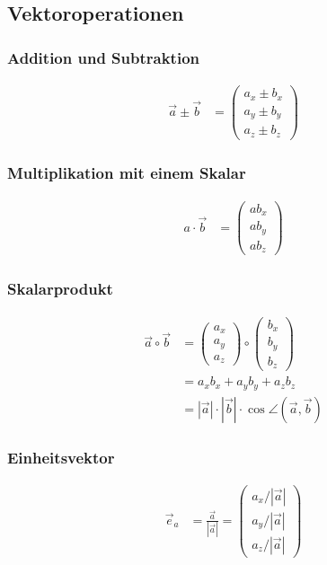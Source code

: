 \newpage
\subsection{Vektoroperationen}
\begin{multicols}{2}
\subsubsection*{Addition und Subtraktion}
\begin{align*} 
\vec{a}\pm\vec{b}&= \begin{pmatrix}a_x\pm b_x\\a_y\pm b_y\\a_z\pm b_z\end{pmatrix}
\end{align*}
\vfill
\subsubsection*{Multiplikation mit einem Skalar}
\begin{align*} 
a\cdot\vec{b}&= \begin{pmatrix}ab_x\\ ab_y\\ab_z\end{pmatrix}
\end{align*}
\vspace{5mm}
\vfill
\end{multicols}

\begin{multicols}{2}
\subsubsection*{Skalarprodukt}
\begin{align*} 
\vec{a}\circ\vec{b} &= \begin{pmatrix}a_x\\ a_y\\a_z\end{pmatrix}\circ\begin{pmatrix}b_x\\ b_y\\b_z\end{pmatrix}\\
&=a_xb_x+a_yb_y+a_zb_z\\
&=|\vec{a}|\cdot|\vec{b}|\cdot \cos\angle(\vec{a},\vec{b})
\end{align*}
\vfill
\subsubsection*{Einheitsvektor}
\begin{align*} 
\vec{e}_a&=\frac{\vec{a}}{|\vec{a}|}= \begin{pmatrix}a_x/|\vec{a}|\\ a_y/|\vec{a}|\\a_z/|\vec{a}|\end{pmatrix}
\end{align*}
\vfill
\end{multicols}


